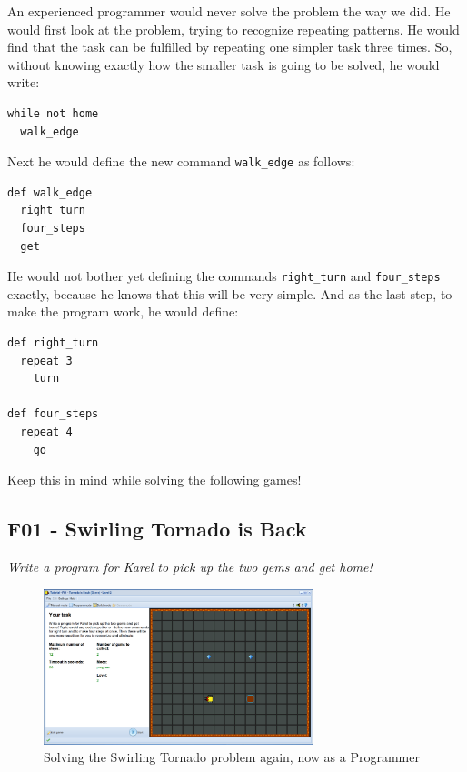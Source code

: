 \documentclass[article,A4,12pt]{llncs}
\begin{document}
An experienced programmer would never solve the problem the way we did.
He would first look at the problem, trying to recognize repeating patterns. 
He would find that the task can be fulfilled by repeating one simpler task 
three times. So, without knowing exactly how the smaller task is going to 
be solved, he would write:

{\small
\begin{verbatim}
while not home
  walk_edge
\end{verbatim}
}
\noindent
Next he would define the new command {\tt walk\_edge} as follows:

{\small
\begin{verbatim}
def walk_edge
  right_turn
  four_steps
  get
\end{verbatim}
}
\noindent
He would not bother yet defining the commands {\tt right\_turn} and 
{\tt four\_steps} exactly, because he knows that this will be very 
simple. And as the last step, to make the program work, he would 
define:

{\small
\begin{verbatim}
def right_turn
  repeat 3
    turn

def four_steps
  repeat 4
    go
\end{verbatim}
}
\noindent
Keep this in mind while solving the following games!


\subsection{F01 - Swirling Tornado is Back}

{\em Write a program for Karel to pick up the two gems and get home! }

\begin{figure}[!ht]
\begin{center}
\includegraphics[width=0.7\textwidth]{img/f01.png}
\end{center}
\vspace{-4mm}
\caption{Solving the Swirling Tornado problem again, now as a Programmer}
\label{fig:f01}
\vspace{-10mm}
\end{figure}
\noindent
\newpage
\end{document}
